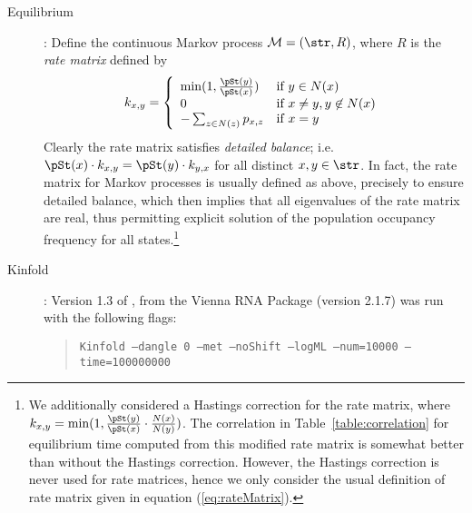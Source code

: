\begin{description}
\item[Equilibrium]: Define the continuous Markov process
$\mathcal{M}=(\str,R)$, where $R$ is the {\em rate matrix} defined
by
\begin{align}
\label{eq:rateMatrix} k_{x,y} = \left\{
\begin{array}{ll}

\min(1, \frac{\pSt(y)}{\pSt(x)} ) &\mbox{if $y \in N(x)$}\\
0 &\mbox{if $x \ne y, y \not\in N(x)$}\\
- \sum_{\substack{z \in N(z)}} p_{x,z} &\mbox{if $x=y$}\\
\end{array}
\right.
\end{align}
Clearly the rate matrix satisfies {\em detailed balance}; i.e. $\pSt(x)
\cdot k_{x,y} = \pSt(y) \cdot k_{y,x}$ for all distinct $x,y \in
\str$. In fact, the rate matrix for Markov processes is usually
defined as above, precisely to ensure detailed balance, which then
implies that all eigenvalues of the rate matrix are real, thus
permitting explicit solution of the population occupancy frequency for
all states.\footnote{We additionally considered a Hastings correction
for the rate matrix, where $k_{x,y} = \min(1, \frac{\pSt(y)}{\pSt(x)}
\cdot \frac{N(x)}{N(y)})$. The correlation in
Table~\ref{table:correlation} for equilibrium time computed from this
modified rate matrix is somewhat better than without the Hastings
correction. However, the Hastings correction is never used for rate
matrices, hence we only consider the usual definition of rate matrix
given in equation (\ref{eq:rateMatrix}).}

\item[Kinfold]: Version 1.3 of \kinfold \cite{Flamm:00a}, from
the Vienna RNA Package (version 2.1.7) was run with the following
flags:
\begin{quote}
{\tt Kinfold --dangle 0 --met --noShift --logML --num=10000
--time=100000000}


\end{quote}
\end{description}
